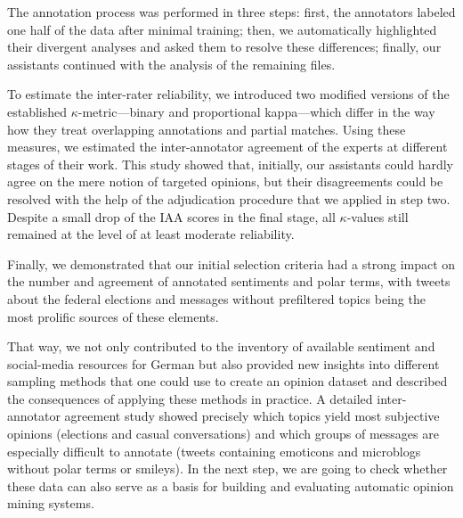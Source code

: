 The annotation process was performed in three steps: first, the
annotators labeled one half of the data after minimal training; then,
we automatically highlighted their divergent analyses and asked them
to resolve these differences; finally, our assistants continued with
the analysis of the remaining files.

To estimate the inter-rater reliability, we introduced two modified
versions of the established $\kappa$-metric---binary and proportional
kappa---which differ in the way how they treat overlapping annotations
and partial matches.  Using these measures, we estimated the
inter-annotator agreement of the experts at different stages of their
work.  This study showed that, initially, our assistants could hardly
agree on the mere notion of targeted opinions, but their disagreements
could be resolved with the help of the adjudication procedure that we
applied in step two.  Despite a small drop of the IAA scores in the
final stage, all $\kappa$-values still remained at the level of at
least moderate reliability.

Finally, we demonstrated that our initial selection criteria had a
strong impact on the number and agreement of annotated sentiments and
polar terms, with tweets about the federal elections and messages
without prefiltered topics being the most prolific sources of these
elements.

That way, we not only contributed to the inventory of available
sentiment and social-media resources for German but also provided new
insights into different sampling methods that one could use to create
an opinion dataset and described the consequences of applying these
methods in practice.  A detailed inter-annotator agreement study
showed precisely which topics yield most subjective opinions
(elections and casual conversations) and which groups of messages are
especially difficult to annotate (tweets containing emoticons and
microblogs without polar terms or smileys).  In the next step, we are
going to check whether these data can also serve as a basis for
building and evaluating automatic opinion mining systems.

